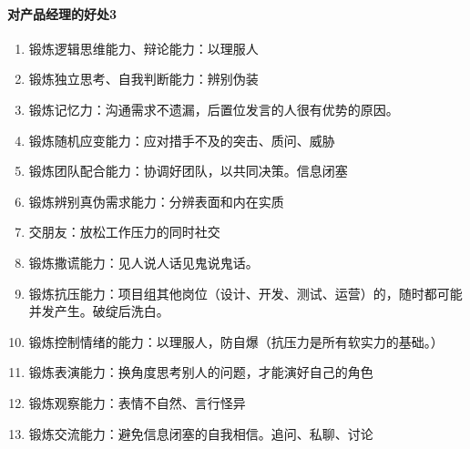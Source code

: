 \documentclass[letterpaper,10pt,english]{sphinxmanual}
\begin{document}
\paragraph{对产品经理的好处3\sphinxfootnotemark[697]}
\label{\detokenize{chapter_experience/jubensha:id7}}%
\begin{footnotetext}[697]\sphinxAtStartFootnote
{}
%
\end{footnotetext}\ignorespaces \begin{enumerate}
%
\item {} 
锻炼逻辑思维能力、辩论能力：以理服人

\item {} 
锻炼独立思考、自我判断能力：辨别伪装

\item {} 
锻炼记忆力：沟通需求不遗漏，后置位发言的人很有优势的原因。

\item {} 
锻炼随机应变能力：应对措手不及的突击、质问、威胁%
\begin{footnote}[698]\sphinxAtStartFootnote
{}
%
\end{footnote}

\item {} 
锻炼团队配合能力：协调好团队，以共同决策。信息闭塞

\item {} 
锻炼辨别真伪需求能力：分辨表面和内在实质

\item {} 
交朋友：放松工作压力的同时社交

\item {} 
锻炼撒谎能力：见人说人话见鬼说鬼话。

\item {} 
锻炼抗压能力：项目组其他岗位（设计、开发、测试、运营）的，随时都可能并发产生。破绽后洗白。

\item {} 
锻炼控制情绪的能力：以理服人，防自爆（抗压力是所有软实力的基础。）

\item {} 
锻炼表演能力：换角度思考别人的问题，才能演好自己的角色

\item {} 
锻炼观察能力：表情不自然、言行怪异%
\begin{footnote}[699]\sphinxAtStartFootnote
{}
%
\end{footnote}

\item {} 
锻炼交流能力：避免信息闭塞的自我相信。追问、私聊、讨论

\end{enumerate}
\end{document}
